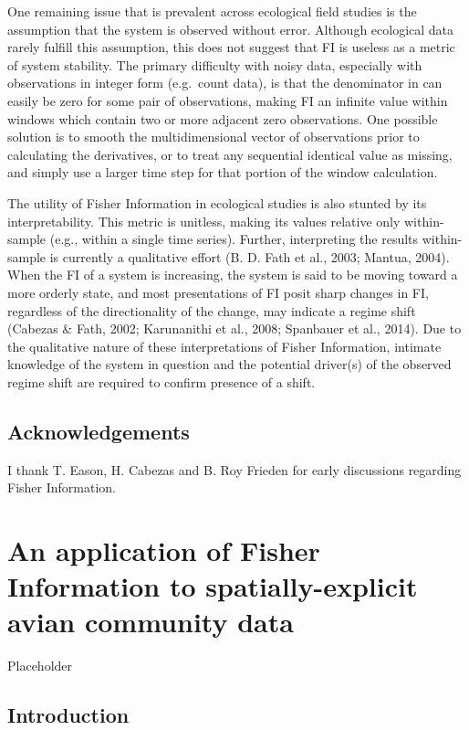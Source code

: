 \documentclass[12pt,twoside,openany]{reedthesis}
\begin{document}
One remaining issue that is prevalent across ecological field studies is
the assumption that the system is observed without error. Although
ecological data rarely fulfill this assumption, this does not suggest
that FI is useless as a metric of system stability. The primary
difficulty with noisy data, especially with observations in integer form
(e.g.~count data), is that the denominator in can easily be zero for
some pair of observations, making FI an infinite value within windows
which contain two or more adjacent zero observations. One possible
solution is to smooth the multidimensional vector of observations prior
to calculating the derivatives, or to treat any sequential identical
value as missing, and simply use a larger time step for that portion of
the window calculation.

The utility of Fisher Information in ecological studies is also stunted
by its interpretability. This metric is unitless, making its values
relative only within-sample (e.g., within a single time series).
Further, interpreting the results within-sample is currently a
qualitative effort (B. D. Fath et al., 2003; Mantua, 2004). When the FI
of a system is increasing, the system is said to be moving toward a more
orderly state, and most presentations of FI posit sharp changes in FI,
regardless of the directionality of the change, may indicate a regime
shift (Cabezas \& Fath, 2002; Karunanithi et al., 2008; Spanbauer et
al., 2014). Due to the qualitative nature of these interpretations of
Fisher Information, intimate knowledge of the system in question and the
potential driver(s) of the observed regime shift are required to confirm
presence of a shift.

\section{Acknowledgements}\label{acknowledgements}

I thank T. Eason, H. Cabezas and B. Roy Frieden for early discussions
regarding Fisher Information.

\chapter{An application of Fisher Information to spatially-explicit
avian community data}\label{fisherSpatial}

Placeholder

\section{Introduction}\label{introduction-2}
\end{document}
